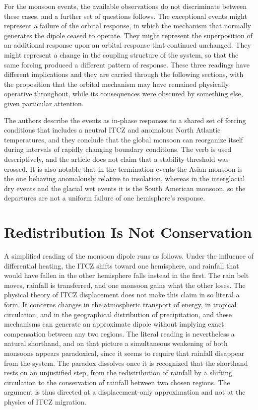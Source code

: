 \documentclass[11pt]{article}
\theoremstyle{definition}
\begin{document}
For the monsoon events, the available observations do not discriminate between these cases, and a further set of questions follows. The exceptional events might represent a failure of the orbital response, in which the mechanism that normally generates the dipole ceased to operate. They might represent the superposition of an additional response upon an orbital response that continued unchanged. They might represent a change in the coupling structure of the system, so that the same forcing produced a different pattern of response. These three readings have different implications and they are carried through the following sections, with the proposition that the orbital mechanism may have remained physically operative throughout, while its consequences were obscured by something else, given particular attention.

The authors describe the events as in-phase responses to a shared set of forcing conditions that includes a neutral ITCZ and anomalous North Atlantic temperatures, and they conclude that the global monsoon can reorganize itself during intervals of rapidly changing boundary conditions. The verb is used descriptively, and the article does not claim that a stability threshold was crossed. It is also notable that in the termination events the Asian monsoon is the one behaving anomalously relative to insolation, whereas in the interglacial dry events and the glacial wet events it is the South American monsoon, so the departures are not a uniform failure of one hemisphere's response.

\section{Redistribution Is Not Conservation}

A simplified reading of the monsoon dipole runs as follows. Under the influence of differential heating, the ITCZ shifts toward one hemisphere, and rainfall that would have fallen in the other hemisphere falls instead in the first. The rain belt moves, rainfall is transferred, and one monsoon gains what the other loses. The physical theory of ITCZ displacement does not make this claim in so literal a form. It concerns changes in the atmospheric transport of energy, in tropical circulation, and in the geographical distribution of precipitation, and these mechanisms can generate an approximate dipole without implying exact compensation between any two regions. The literal reading is nevertheless a natural shorthand, and on that picture a simultaneous weakening of both monsoons appears paradoxical, since it seems to require that rainfall disappear from the system. The paradox dissolves once it is recognized that the shorthand rests on an unjustified step, from the redistribution of rainfall by a shifting circulation to the conservation of rainfall between two chosen regions. The argument is thus directed at a displacement-only approximation and not at the physics of ITCZ migration.
\end{document}

